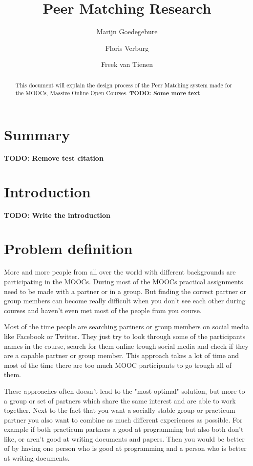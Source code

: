 \documentclass[]{article}
\title{Peer Matching Research}
\author{Marijn Goedegebure \and
	Floris Verburg \and
	Freek van Tienen}
\date{}
\newcommand{\TODO}[1]{{\color{red}\textbf{TODO: #1}}}
\begin{document}
\maketitle

\begin{abstract}
This document will explain the design process of the Peer Matching system made for the MOOCs, Massive Online Open Courses.
\TODO{Some more text}
\end{abstract}

\newpage

\tableofcontents

\newpage

\section{Summary}
\TODO{Remove test citation\cite{loughry2010design}}

\section{Introduction}
\TODO{Write the introduction}

\section{Problem definition}
More and more people from all over the world with different backgrounds are participating in the MOOCs.
During most of the MOOCs practical assignments need to be made with a partner or in a group.
But finding the correct partner or group members can become really difficult when you don't see each other during courses and haven't even met most of the people from you course.

Most of the time people are searching partners or group members on social media like Facebook or Twitter.
They just try to look through some of the participants names in the course, search for them online trough social media and check if they are a capable partner or group member.
This approach takes a lot of time and most of the time there are too much MOOC participants to go trough all of them.

These approaches often doesn't lead to the "most optimal" solution, but more to a group or set of partners which share the same interest and are able to work together.
Next to the fact that you want a socially stable group or practicum partner you also want to combine as much different experiences as possible.
For example if both practicum partners a good at programming but also both don't like, or aren't good at writing documents and papers.
Then you would be better of by having one person who is good at programming and a person who is better at writing documents.
\end{document}
